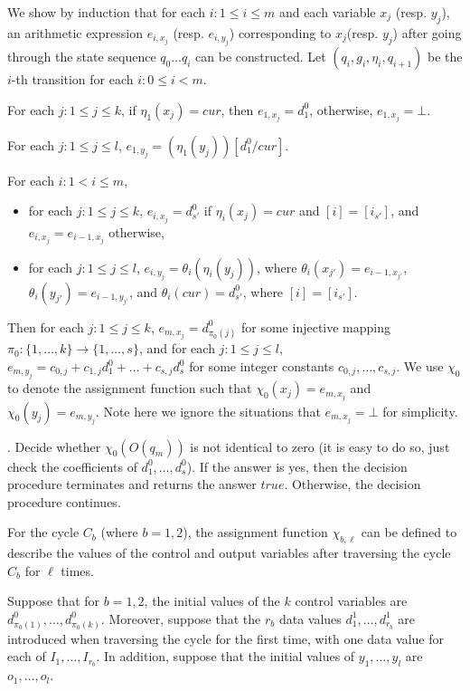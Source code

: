 \documentclass[runningheads,a4paper]{llncs}
\begin{document}
We show by induction that for each $i: 1 \le i \le m$ and each variable $x_j$ (resp. $y_j$), an arithmetic expression $e_{i,x_j}$ (resp. $e_{i,y_j}$) corresponding to $x_j$(resp. $y_j$) after going through the state sequence $q_0 \dots q_i$ can be constructed. Let $(q_{i}, g_{i}, \eta_{i}, q_{i+1})$ be the $i$-th transition for each $i: 0 \le i < m$.

For each $j: 1 \le j \le k$, if $\eta_1(x_j)=cur$, then $e_{1,x_j}=d^0_1$, otherwise, $e_{1,x_j}=\bot$.

For each $j: 1 \le j \le l$, $e_{1,y_j} = (\eta_{1}(y_j))[d^0_1/cur]$. 

For each $i: 1 < i \le m$, 
\begin{itemize}
\item for each $j: 1 \le j \le k$, $e_{i,x_j}=d^0_{s'}$ if $\eta_i(x_j)=cur$ and $[i] = [i_{s'}]$, and $e_{i,x_j}=e_{i-1,x_j}$ otherwise,
%
\item for each $j: 1 \le j \le l$, $e_{i,y_j} = \theta_i(\eta_i(y_j))$, where $\theta_i(x_{j'})=e_{i-1,x_{j'}}$, $\theta_i(y_{j'})=e_{i-1, y_{j'}}$, and $\theta_i(cur)=d^0_{s'}$, where $[i]=[i_{s'}]$.
\end{itemize}

Then for each $j: 1 \le j \le k$, $e_{m,x_j}=d^0_{\pi_0(j)}$ for some injective mapping $\pi_0: \{1,\dots,k\} \rightarrow \{1,\dots,s\}$, and for each $j: 1 \le j \le l$, $e_{m,y_j} = c_{0,j} + c_{1,j} d^0_1 + \dots + c_{s,j} d^0_s$ for some integer constants $c_{0,j},\dots, c_{s,j}$. We use $\chi_0$ to denote the assignment function such that $\chi_0(x_j)=e_{m,x_j}$ and $\chi_0(y_j)=e_{m,y_j}$. Note here we ignore the situations that $e_{m,x_j} = \bot$ for simplicity.

\smallskip

. Decide whether $\chi_0(O(q_m))$ is not identical to zero (it is easy to do so, just check the coefficients of $d^0_1, \dots, d^0_s$). If the answer is yes, then the decision procedure terminates and returns the answer $true$. Otherwise, the decision procedure continues.

\smallskip

For the cycle $C_b$ (where $b=1,2$), the assignment function $\chi_{b,\ell}$ can be defined to describe the values of the control and output variables after traversing the cycle $C_b$ for $\ell$ times.

Suppose that for $b=1,2$, the initial values of the $k$ control variables are $d^0_{\pi_0(1)},\dots,d^0_{\pi_0(k)}$. Moreover, suppose that the $r_b$ data values $d^1_{1}, \dots, d^1_{r_b}$ are introduced when traversing the cycle for the first time, with one data value for each of $I_{1},\dots,I_{r_b}$. 
In addition, suppose that the initial values of $y_1,\dots, y_l$ are $o_1,\dots,o_l$. 
\end{document}
